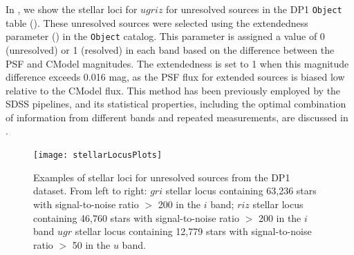 In , we show the stellar loci for $ugriz$ for unresolved sources in the DP1 \texttt{Object} table ().
These unresolved sources  were selected using the extendedness parameter () in the \texttt{Object} catalog. 
This parameter is assigned a value of 0 (unresolved) or 1 (resolved) in each band based on the difference between the PSF and CModel magnitudes. 
The extendedness is set to 1 when this magnitude difference exceeds 0.016 mag, as the PSF flux for extended sources is biased low relative to the CModel flux. 
This method has been previously employed by the SDSS pipelines, and its statistical properties, including the optimal combination of information from different bands and repeated measurements, are discussed in \cite{2020AJ....159...65S}.

\begin{figure}[htb!]
\texttt{[image: stellarLocusPlots]}
\caption{Examples of stellar loci for unresolved sources from the DP1 dataset. From left to right: 
$gri$ stellar locus containing 63,236 stars with signal-to-noise ratio $>$ 200 in the $i$ band;
$riz$ stellar locus containing 46,760 stars with signal-to-noise ratio $>$ 200 in the $i$ band
$ugr$ stellar locus containing 12,779 stars with signal-to-noise ratio $>$ 50 in the $u$ band.}
\label{fig:stellarloci}
\end{figure}

